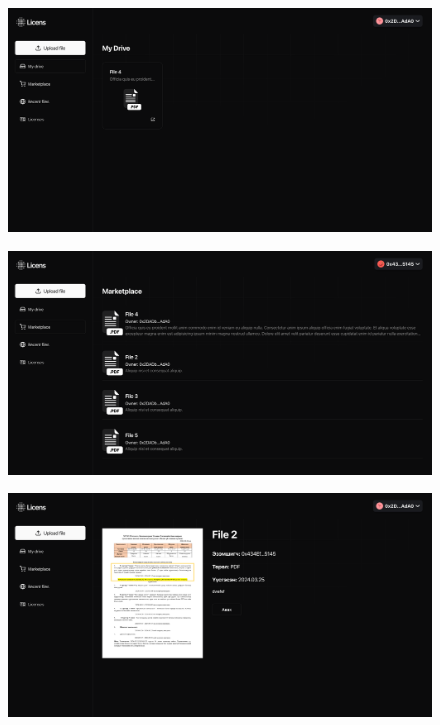 \begin{figure}[h!]
	\centering
	\includegraphics[scale=0.165]{src/images/drive-page.png}
	\caption{}
\end{figure}

\begin{figure}[h!]
	\centering
	\includegraphics[scale=0.165]{src/images/marketplace-page.png}
	\caption{}
\end{figure}

\begin{figure}[h!]
	\centering
	\includegraphics[scale=0.165]{src/images/file-page.png}
	\caption{}
\end{figure}